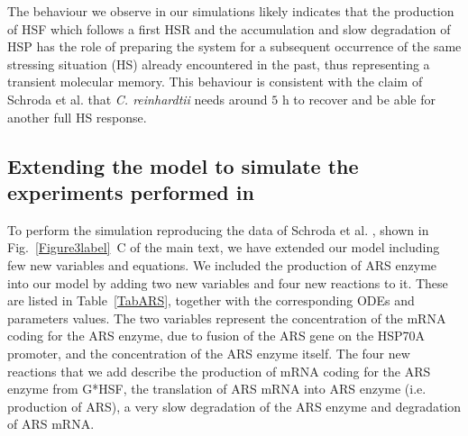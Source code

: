 \documentclass[oneside, 10pt, a4paper, twocolumn]{article}
\begin{document}
The behaviour we observe in our simulations likely indicates that the production of HSF which follows a first HSR and the accumulation and slow degradation of HSP has the role of preparing the system for a subsequent occurrence of the same stressing situation (HS) already encountered in the past, thus representing a transient molecular memory. 
This behaviour is consistent with the claim of Schroda et al. \cite{Schroda2000} that \emph{C. reinhardtii} needs around $5$ h to recover and be able for another full HS response. %







\subsection{Extending the model to simulate the experiments performed in \cite{Schroda2000}}
\label{SecARSSM}

To perform the simulation reproducing the data of Schroda et al. \cite{Schroda2000}, shown in Fig.~\ref{Figure3label}~C of the main text, we have extended our model including few new variables and equations. 
We included the production of ARS enzyme into our model by adding two new variables and four new reactions to it. 
These are listed in Table~\ref{TabARS}, together with the corresponding ODEs and parameters values.
The two variables represent the concentration of the mRNA coding for the ARS enzyme, due to fusion of the ARS gene on the HSP70A promoter, and the concentration of the ARS enzyme itself.
The four new reactions that we add describe the production of mRNA coding for the ARS enzyme from G*HSF, the translation of ARS mRNA into ARS enzyme (i.e. production of ARS), a very slow degradation of the ARS enzyme and degradation of ARS mRNA.
\end{document}

